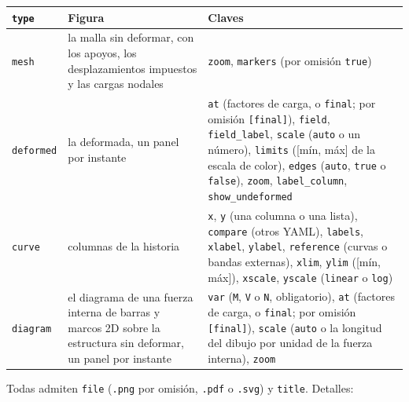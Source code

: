\documentclass[11pt,oneside]{report}
\begin{document}
\begin{center}
\begin{tabularx}{\textwidth}{YYY}
\hline
\textbf{\texttt{type}} & \textbf{Figura} & \textbf{Claves} \\
\hline
\texttt{mesh} & la malla sin deformar, con los apoyos, los desplazamientos impuestos y las cargas nodales & \texttt{zoom}, \texttt{markers} (por omisión \texttt{true}) \\
\texttt{deformed} & la deformada, un panel por instante & \texttt{at} (factores de carga, o \texttt{final}; por omisión \texttt{[final]}), \texttt{field}, \texttt{field\_label}, \texttt{scale} (\texttt{auto} o un número), \texttt{limits} ([mín, máx] de la escala de color), \texttt{edges} (\texttt{auto}, \texttt{true} o \texttt{false}), \texttt{zoom}, \texttt{label\_column}, \texttt{show\_undeformed} \\
\texttt{curve} & columnas de la historia & \texttt{x}, \texttt{y} (una columna o una lista), \texttt{compare} (otros YAML), \texttt{labels}, \texttt{xlabel}, \texttt{ylabel}, \texttt{reference} (curvas o bandas externas), \texttt{xlim}, \texttt{ylim} ([mín, máx]), \texttt{xscale}, \texttt{yscale} (\texttt{linear} o \texttt{log}) \\
\texttt{diagram} & el diagrama de una fuerza interna de barras y marcos 2D sobre la estructura sin deformar, un panel por instante & \texttt{var} (\texttt{M}, \texttt{V} o \texttt{N}, obligatorio), \texttt{at} (factores de carga, o \texttt{final}; por omisión \texttt{[final]}), \texttt{scale} (\texttt{auto} o la longitud del dibujo por unidad de la fuerza interna), \texttt{zoom} \\
\hline
\end{tabularx}
\end{center}
Todas admiten \texttt{file} (\texttt{.png} por omisión, \texttt{.pdf} o \texttt{.svg}) y \texttt{title}. Detalles:
\end{document}
